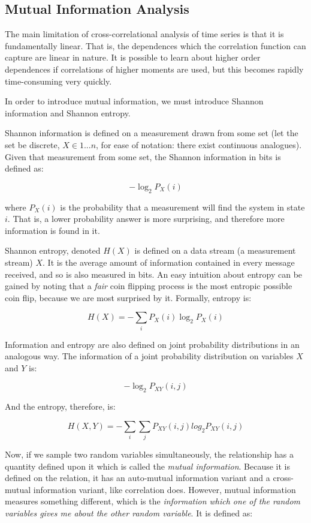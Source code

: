 \documentclass[12pt]{article}
\begin{document}
\subsection{Mutual Information Analysis}

The main limitation of cross-correlational analysis of time series is that it is fundamentally linear. That is, the dependences which the correlation function can capture are linear in nature. It is possible to learn about higher order dependences if correlations of higher moments are used, but this becomes rapidly time-consuming very quickly. %


In order to introduce mutual information, we must introduce Shannon information and Shannon entropy.

Shannon information is defined on a measurement drawn from some set (let the set be discrete, $X \in {1 ... n}$, for ease of notation: there exist continuous analogues). Given that measurement from some set, the Shannon information in bits is defined as:

$$ -\log_2 P_X(i) $$

where $P_X(i)$ is the probability that a measurement will find the system in state $i$. That is, a lower probability answer is more surprising, and therefore more information is found in it.

Shannon entropy, denoted $H(X)$ is defined on a data stream (a measurement stream) $X$. It is the average amount of information contained in every message received, and so is also measured in bits. An easy intuition about entropy can be gained by noting that a \emph{fair} coin flipping process is the most entropic possible coin flip, because we are most surprised by it. Formally, entropy is:

$$H(X) = -\sum_i P_X(i) \log_2 P_X(i)$$

Information and entropy are also defined on joint probability distributions in an analogous way. The information of a joint probability distribution on variables $X$ and $Y$ is:

$$ -\log_2 P_{XY}(i, j) $$

And the entropy, therefore, is:

$$H(X, Y) = -\sum_i \sum_j P_{XY}(i, j) log_2 P_{XY}(i, j)$$

Now, if we sample two random variables simultaneously, the relationship has a quantity defined upon it which is called the \emph{mutual information}. Because it is defined on the relation, it has an auto-mutual information variant and a cross-mutual information variant, like correlation does. However, mutual information measures something different, which is the \emph{information which one of the random variables gives me about the other random variable}. It is defined as:
\end{document}
